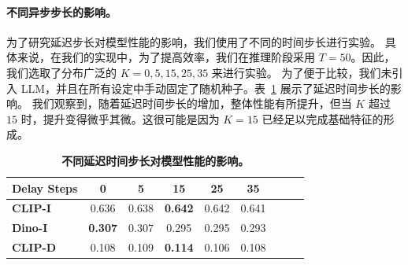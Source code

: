 \paragraph{不同异步步长的影响。} 为了研究延迟步长对模型性能的影响，我们使用了不同的时间步长进行实验。
具体来说，在我们的实现中，为了提高效率，我们在推理阶段采用 $T=50$。因此，我们选取了分布广泛的 $K=0, 5, 15, 25, 35$ 来进行实验。
为了便于比较，我们未引入 LLM，并且在所有设定中手动固定了随机种子。表~\ref{table:ablate_time_steps} 展示了延迟时间步长的影响。
我们观察到，随着延迟时间步长的增加，整体性能有所提升，但当 $K$ 超过 $15$ 时，提升变得微乎其微。这很可能是因为 $K=15$ 已经足以完成基础特征的形成。


\begin{table}[h]
\setlength{\tabcolsep}{28pt}
\begin{center}
\caption{\textbf{不同延迟时间步长对模型性能的影响。}}
\label{table:ablate_time_steps}
\begin{tabular}{lcccccccc}
\toprule
Delay Steps & 0 & 5 &  15 & 25 &
35 \\

\midrule
\textbf{CLIP-I} & 0.636 & 0.638 & \textbf{0.642} & 0.642 & 0.641  \\
\textbf{Dino-I} & \textbf{0.307} & 0.307 & 0.295 & 0.295 & 0.293 \\
\textbf{CLIP-D} & 0.108 & 0.109 & \textbf{0.114} & 0.106 & 0.108 \\
\bottomrule
\end{tabular}
\end{center}
\end{table}



